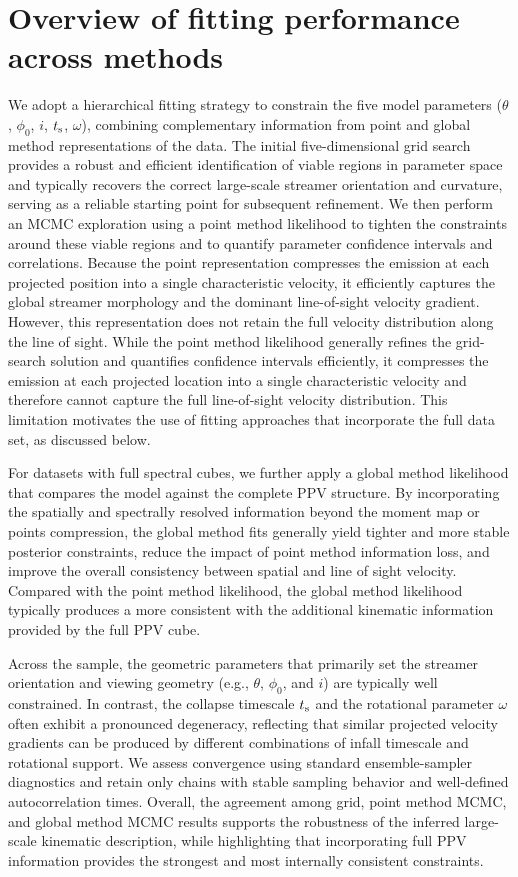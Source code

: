 \section{Overview of fitting performance across methods}
We adopt a hierarchical fitting strategy to constrain the five model parameters ($\theta$, $\phi_0$, $i$, $t_{\rm s}$, $\omega$), combining complementary information from point and global method representations of the data. The initial five-dimensional grid search provides a robust and efficient identification of viable regions in parameter space and typically recovers the correct large-scale streamer orientation and curvature, serving as a reliable starting point for subsequent refinement. We then perform an MCMC exploration using a point method likelihood to tighten the constraints around these viable regions and to quantify parameter confidence intervals and correlations. Because the point representation compresses the emission at each projected position into a single characteristic velocity, it efficiently captures the global streamer morphology and the dominant line-of-sight velocity gradient. However, this representation does not retain the full velocity distribution along the line of sight. While the point method likelihood generally refines the grid-search solution and quantifies confidence intervals efficiently, it compresses the emission at each projected location into a single characteristic velocity and therefore cannot capture the full line-of-sight velocity distribution. This limitation motivates the use of fitting approaches that incorporate the full data set, as discussed below.

For datasets with full spectral cubes, we further apply a global method likelihood that compares the model against the complete PPV structure. By incorporating the spatially and spectrally resolved information beyond the moment map or points compression, the global method fits generally yield tighter and more stable posterior constraints, reduce the impact of point method information loss, and improve the overall consistency between spatial and line of sight velocity. Compared with the point method likelihood, the global method likelihood typically produces a more consistent with the additional kinematic information provided by the full PPV cube.

Across the sample, the geometric parameters that primarily set the streamer orientation and viewing geometry (e.g., $\theta$, $\phi_0$, and $i$) are typically well constrained. In contrast, the collapse timescale $t_{\rm s}$ and the rotational parameter $\omega$ often exhibit a pronounced degeneracy, reflecting that similar projected velocity gradients can be produced by different combinations of infall timescale and rotational support. We assess convergence using standard ensemble-sampler diagnostics and retain only chains with stable sampling behavior and well-defined autocorrelation times. Overall, the agreement among grid, point method MCMC, and global method MCMC results supports the robustness of the inferred large-scale kinematic description, while highlighting that incorporating full PPV information provides the strongest and most internally consistent constraints.

